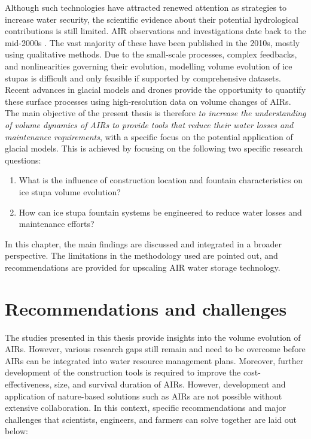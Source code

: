 Although such technologies have attracted renewed attention as strategies to increase water security, the scientific evidence about their potential hydrological contributions is still limited. AIR observations and investigations
date back to the mid-2000s \citep{tveitenGlacierGrowingLocal2007}. The vast majority of these have been published in the
2010s, mostly using qualitative methods. Due to the small-scale processes, complex feedbacks, and nonlinearities
governing their evolution, modelling volume evolution of ice stupas is difficult and only feasible if supported
by comprehensive datasets. Recent advances in glacial models and drones provide the opportunity to quantify
these surface processes using high-resolution data on volume changes of \ac{AIRs}. The main objective of the present
thesis is therefore \textit{to increase the understanding of volume dynamics of \ac{AIRs} to provide tools
that reduce their water losses and maintenance requirements}, with a specific focus on the potential application
of glacial models. This is achieved by focusing on the following two specific research questions:

\begin{enumerate}
  \item{What is the influence of construction location and fountain characteristics on ice stupa volume
    evolution?}
  \item{How can ice stupa fountain systems be engineered to reduce water losses and maintenance efforts?}
\end{enumerate}

In this chapter, the main findings are discussed and integrated in a broader perspective. The limitations in the
methodology used are pointed out, and recommendations are provided for upscaling AIR water storage technology.

\section{Recommendations and challenges}

The studies presented in this thesis provide insights into the volume evolution of \ac{AIRs}. However, various research gaps still remain and need to be overcome before \ac{AIRs} can be integrated into water resource
management plans. Moreover, further development of the construction tools is required to improve the
cost-effectiveness, size, and survival duration of \ac{AIRs}. However, development and application of
nature-based solutions such as \ac{AIRs} are not possible without extensive collaboration. In this context,
specific recommendations and major challenges that scientists, engineers, and farmers can solve together are laid
out below:


